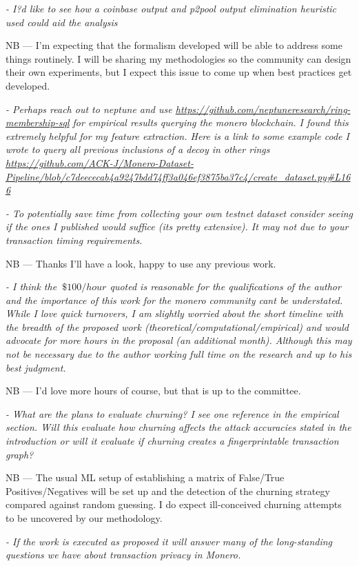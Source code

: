 \documentclass[prc, 12pt]{revtex4-1}
\begin{document}
\textit{- I?d like to see how a coinbase output and p2pool output elimination heuristic used could aid the analysis}

NB --- I'm expecting that the formalism developed will be able to address some things routinely.  I will be sharing my methodologies so the community can design their own experiments, but I expect this issue to come up when best practices get developed. 

\textit{- Perhaps reach out to neptune and use \url{https://github.com/neptuneresearch/ring-membership-sql} for empirical results querying the monero blockchain. I found this extremely helpful for my feature extraction. Here is a link to some example code I wrote to query all previous inclusions of a decoy in other rings \url{https://github.com/ACK-J/Monero-Dataset-Pipeline/blob/c7deececab4a9247bdd74ff3a046ef3875ba37c4/create_dataset.py#L166}}

\textit{- To potentially save time from collecting your own testnet dataset consider seeing if the ones I published would suffice (its pretty extensive). It may not due to your transaction timing requirements.}

NB --- Thanks I'll have a look, happy to use any previous work.  

\textit{- I think the $~\$100/hour$ quoted is reasonable for the qualifications of the author and the importance of this work for the monero community cant be understated. While I love quick turnovers, I am slightly worried about the short timeline with the breadth of the proposed work (theoretical/computational/empirical) and would advocate for more hours in the proposal (an additional month). Although this may not be necessary due to the author working full time on the research and up to his best judgment.}

NB --- I'd love more hours of course, but that is up to the committee.

\textit{- What are the plans to evaluate churning? I see one reference in the empirical section. Will this evaluate how churning affects the attack accuracies stated in the introduction or will it evaluate if churning creates a fingerprintable transaction graph?}

NB --- The usual ML setup of establishing a matrix of False/True Positives/Negatives will be set up and the detection of the churning strategy compared against random guessing.  I do expect ill-conceived churning attempts to be uncovered by our methodology.

\textit{- If the work is executed as proposed it will answer many of the long-standing questions we have about transaction privacy in Monero.}
\end{document}
